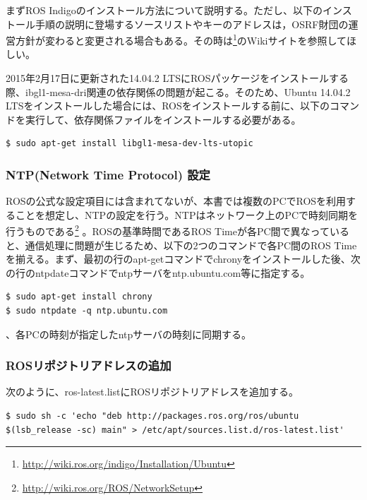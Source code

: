 まずROS Indigoのインストール方法について説明する。ただし、以下のインストール手順の説明に登場するソースリストやキーのアドレスは，OSRF財団の運営方針が変わると変更される場合もある。その時は\footnote{\url{http://wiki.ros.org/indigo/Installation/Ubuntu}}のWikiサイトを参照してほしい。

\begin{exercise}
  2015年2月17日に更新された14.04.2 LTSにROSパッケージをインストールする際、ibgl1-mesa-dri関連の依存関係の問題が起こる。そのため、Ubuntu 14.04.2 LTSをインストールした場合には、ROSをインストールする前に、以下のコマンドを実行して、依存関係ファイルをインストールする必要がある。
  \begin{lstlisting}[language=ROS]
  $ sudo apt-get install libgl1-mesa-dev-lts-utopic
  \end{lstlisting}
\end{exercise}

\subsubsection{NTP(Network Time Protocol) 設定}

ROSの公式な設定項目には含まれてないが、本書では複数のPCでROSを利用することを想定し、NTPの設定を行う。NTPはネットワーク上のPCで時刻同期を行うものである\footnote{\url{http://wiki.ros.org/ROS/NetworkSetup}} 。ROSの基準時間であるROS Timeが各PC間で異なっていると、通信処理に問題が生じるため、以下の2つのコマンドで各PC間のROS Timeを揃える。まず、最初の行のapt-getコマンドでchronyをインストールした後、次の行のntpdateコマンドでntpサーバをntp.ubuntu.com等に指定する。

\begin{lstlisting}[language=ROS]
$ sudo apt-get install chrony
$ sudo ntpdate -q ntp.ubuntu.com
\end{lstlisting}

、各PCの時刻が指定したntpサーバの時刻に同期する。

\subsubsection{ROSリポジトリアドレスの追加}

次のように、ros-latest.listにROSリポジトリアドレスを追加する。

\begin{lstlisting}[language=ROS]
$ sudo sh -c 'echo "deb http://packages.ros.org/ros/ubuntu $(lsb_release -sc) main" > /etc/apt/sources.list.d/ros-latest.list'
\end{lstlisting}

